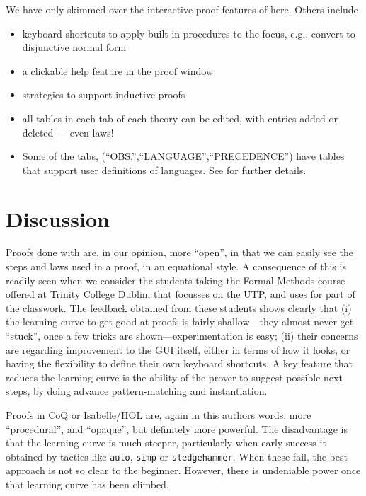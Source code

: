 \documentclass[copyright]{eptcs}
\begin{document}
\noindent
We have only skimmed over the interactive proof features of  here.
Others include
\begin{itemize}
  \item keyboard shortcuts to apply built-in procedures to the focus,
    e.g., convert to disjunctive normal form
  \item
    a clickable help feature in the proof window
  \item strategies to support inductive proofs
  \item
    all tables in each tab of each theory can be edited, with entries added
    or deleted --- even laws!
  \item
    Some of the tabs, (``OBS.'',``LANGUAGE'',``PRECEDENCE'') have
    tables that support user definitions of languages.
    See \cite{conf/utp/Butterfield12} for further details.
\end{itemize}

\section{Discussion}

Proofs done with  are, in our opinion, more ``open'',
in that we can easily see the steps and laws used in a proof, in an equational style.
A consequence of this is readily seen when we consider the students taking the
Formal Methods course offered at Trinity College Dublin, that focusses on the
UTP, and uses  for part of the classwork.
The feedback obtained from these students shows clearly that
(i) the learning curve to get good at  proofs is fairly shallow---they almost never
get ``stuck'', once a few tricks are shown---experimentation is easy;
(ii) their concerns are regarding improvement to the GUI itself,
either in terms of how it looks, or having the flexibility to define their own keyboard
shortcuts.
A key feature that reduces the learning curve is the ability
of the prover to suggest possible next steps, by doing advance pattern-matching
and instantiation.

Proofs in CoQ or Isabelle/HOL are, again in this authors words, more ``procedural'',
and ``opaque'', but definitely more powerful. The disadvantage is that the learning
curve is much steeper, particularly when early success it obtained by tactics like
\texttt{auto}, \texttt{simp} or \texttt{sledgehammer}.
When these fail, the best approach is not so clear to the beginner.
However, there is undeniable power once that learning curve has been climbed.
\end{document}
